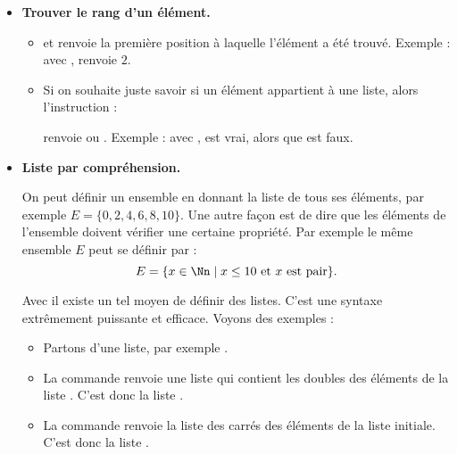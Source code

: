 \documentclass[11pt,class=report,crop=false]{standalone}
\begin{document}
\begin{cours}
\begin{itemize}
\begin{itemize}
   \end{itemize} 
   
   

  \item \textbf{Trouver le rang d'un élément.} 

\begin{itemize}

    \item  {}
    et renvoie la première position à laquelle l'élément a été trouvé. Exemple : avec ,
    renvoie $2$.

  \item   {} 
  Si on souhaite juste savoir si un élément appartient à une liste, alors l'instruction :\\
  \centerline{}  
  renvoie  ou .
  Exemple : avec ,
   \og{}\fg{} est vrai, alors que \og{}\fg{} est faux.
  
\end{itemize}
   
  \item \textbf{Liste par compréhension.}
  
  
  On peut définir un ensemble en donnant la liste de tous ses éléments, par exemple $E = \{0,2,4,6,8,10\}$. Une autre façon est de dire que les éléments de l'ensemble doivent  vérifier une certaine propriété. Par exemple le même ensemble $E$ peut se définir par :
  $$E = \{ x \in \Nn \mid x \le 10 \text{ et } x \text{ est pair} \}.$$
  
  Avec \Python{} il existe un tel moyen de définir des listes. C'est une syntaxe extrêmement puissante et efficace. Voyons des exemples :
  \begin{itemize}
    \item Partons d'une liste, par exemple .
    
    \item La commande  renvoie une liste qui contient les doubles des éléments de la liste . C'est donc la liste 
    \ci{[2,4,6,8,...]}.
    
    \item La commande  renvoie la liste des carrés des éléments de la liste initiale. C'est donc la liste \ci{[1,4,9,16,...]}.
    

\end{itemize}
\end{itemize}
\end{cours}
\end{document}
